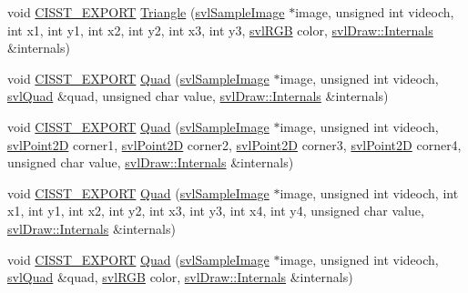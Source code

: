 \begin{DoxyCompactItemize}
\item 
void \hyperlink{cmn_export_macros_8h_a99393e0c3ac434b2605235bbe20684f8}{C\-I\-S\-S\-T\-\_\-\-E\-X\-P\-O\-R\-T} \hyperlink{namespacesvl_draw_a7f3d7efcd5dbc9404bcf3c8e7627f293}{Triangle} (\hyperlink{classsvl_sample_image}{svl\-Sample\-Image} $\ast$image, unsigned int videoch, int x1, int y1, int x2, int y2, int x3, int y3, \hyperlink{structsvl_r_g_b}{svl\-R\-G\-B} color, \hyperlink{classsvl_draw_1_1_internals}{svl\-Draw\-::\-Internals} \&internals)
\item 
void \hyperlink{cmn_export_macros_8h_a99393e0c3ac434b2605235bbe20684f8}{C\-I\-S\-S\-T\-\_\-\-E\-X\-P\-O\-R\-T} \hyperlink{namespacesvl_draw_a9556394a37e0440d5ad9a2c3da21976b}{Quad} (\hyperlink{classsvl_sample_image}{svl\-Sample\-Image} $\ast$image, unsigned int videoch, \hyperlink{structsvl_quad}{svl\-Quad} \&quad, unsigned char value, \hyperlink{classsvl_draw_1_1_internals}{svl\-Draw\-::\-Internals} \&internals)
\item 
void \hyperlink{cmn_export_macros_8h_a99393e0c3ac434b2605235bbe20684f8}{C\-I\-S\-S\-T\-\_\-\-E\-X\-P\-O\-R\-T} \hyperlink{namespacesvl_draw_a6885d9bb85c0fb7cf53f0491dcafc69c}{Quad} (\hyperlink{classsvl_sample_image}{svl\-Sample\-Image} $\ast$image, unsigned int videoch, \hyperlink{structsvl_point2_d}{svl\-Point2\-D} corner1, \hyperlink{structsvl_point2_d}{svl\-Point2\-D} corner2, \hyperlink{structsvl_point2_d}{svl\-Point2\-D} corner3, \hyperlink{structsvl_point2_d}{svl\-Point2\-D} corner4, unsigned char value, \hyperlink{classsvl_draw_1_1_internals}{svl\-Draw\-::\-Internals} \&internals)
\item 
void \hyperlink{cmn_export_macros_8h_a99393e0c3ac434b2605235bbe20684f8}{C\-I\-S\-S\-T\-\_\-\-E\-X\-P\-O\-R\-T} \hyperlink{namespacesvl_draw_a9f9496eeea8aa512916b7b7bab6ca77c}{Quad} (\hyperlink{classsvl_sample_image}{svl\-Sample\-Image} $\ast$image, unsigned int videoch, int x1, int y1, int x2, int y2, int x3, int y3, int x4, int y4, unsigned char value, \hyperlink{classsvl_draw_1_1_internals}{svl\-Draw\-::\-Internals} \&internals)
\item 
void \hyperlink{cmn_export_macros_8h_a99393e0c3ac434b2605235bbe20684f8}{C\-I\-S\-S\-T\-\_\-\-E\-X\-P\-O\-R\-T} \hyperlink{namespacesvl_draw_ac96400e07c14d0d1c4d9d1d106895c20}{Quad} (\hyperlink{classsvl_sample_image}{svl\-Sample\-Image} $\ast$image, unsigned int videoch, \hyperlink{structsvl_quad}{svl\-Quad} \&quad, \hyperlink{structsvl_r_g_b}{svl\-R\-G\-B} color, \hyperlink{classsvl_draw_1_1_internals}{svl\-Draw\-::\-Internals} \&internals)
\item 

\end{DoxyCompactItemize}
